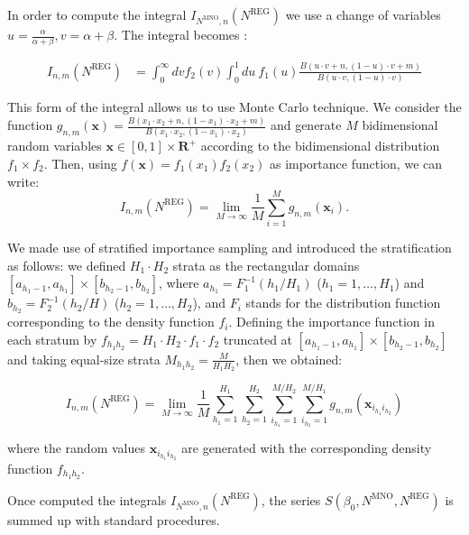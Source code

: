 \documentclass[12pt, a4paper]{article}
\begin{document}
In order to compute the integral $I_{N^{\textrm{MNO}}, n}(N^{\textrm{REG}})$ we use 
a change of variables $u = \frac{\alpha}{\alpha + \beta}, v = \alpha + \beta$. The integral becomes \cite{methodology}:

\begin{align}
\label{MC}I_{n,m}(N^{\textrm{REG}})&= \int_{0}^{\infty}dv f_{2}(v)\int_{0}^{1}du\ f_{1}(u)\frac{B(u\cdot v + n, (1-u)\cdot v + m)}{B(u\cdot v, (1-u)\cdot v)}
\end{align}

This form of the integral allows us to use Monte Carlo technique. We consider the function 
$g_{n,m}(\mathbf{x})=\frac{B(x_{1}\cdot x_{2} + n, (1-x_{1})\cdot x_{2} + m)}{B(x_{1}\cdot x_{2}, (1-x_{1})\cdot x_{2})}$ 
and generate $M$ bidimensional random variables $\mathbf{x}\in[0,1]\times\mathbf{R}^{+}$ according to the bidimensional 
distribution $f_{1}\times f_{2}$. Then, using $f(\mathbf{x})=f_{1}(x_{1})f_{2}(x_{2})$ as importance function, 
we can write:
\begin{equation}
I_{n,m}(N^{\textrm{REG}})=\lim_{M\to\infty}\frac{1}{M}\sum_{i=1}^{M}g_{n,m}(\mathbf{x}_{i}).
\end{equation}

We made use of stratified importance sampling and introduced the stratification as follows: we defined $H_{1}\cdot H_{2}$ strata as the rectangular 
domains $[a_{h_{1}-1}, a_{h_{1}}]\times [b_{h_{2} -1}, b_{h_{2}}]$, where $a_{h_{1}}=F_{1}^{-1}\left(h_{1}/H_{1}\right)$ ($h_{1}=1, \dots, H_{1}$) and $b_{h_{2}}=F_{2}^{-1}\left(h_{2}/H\right)$ ($h_{2}=1, \dots, H_{2}$), 
and $F_{i}$ stands for the distribution function corresponding to the density function $f_{i}$. 
Defining the importance function in each stratum by $f_{h_{1}h_{2}}= H_{1}\cdot H_{2}\cdot f_{1}\cdot f_{2}$ 
truncated at $[a_{h_{1}-1}, a_{h_{1}}]\times[b_{h_{2}-1}, b_{h_{2}}]$ and taking equal-size strata $M_{h_{1}h_{2}}=\frac{M}{H_{1}H_{2}}$, 
then we obtained:

\begin{equation}
I_{n,m}(N^{\textrm{REG}})=\lim_{M\to\infty}\frac{1}{M}\sum_{h_{1}=1}^{H_{1}}\sum_{h_{2}=1}^{H_{2}}\sum_{i_{h_{1}}=1}^{M/H_{2}}\sum_{i_{h_{2}}=1}^{M/H_{1}}g_{n,m}(\mathbf{x}_{i_{h_{1}}i_{h_{2}}})
\end{equation}

\noindent where the random values $\mathbf{x}_{i_{h_{1}}i_{h_{2}}}$ are generated with the corresponding density function $f_{h_{1}h_{2}}$.

Once computed the integrals $I_{N^{\textrm{MNO}}, n}(N^{\textrm{REG}})$, the series $S(\beta_{0}, N^{\textrm{MNO}}, N^{\textrm{REG}})$ is summed up with standard procedures.
\end{document}
